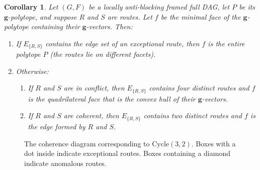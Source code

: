 \documentclass[10pt,a4paper]{amsart}
\newtheorem{corollary}{Corollary}
\newcommand\Cycle{\mathrm{Cycle}}
\newcommand\bg{\mathbf{g}}
\begin{document}
\begin{corollary}\label{cor:incoherence-square}
    Let $(G,F)$ be a locally anti-blocking framed full DAG, let $P$ be its $\bg$-polytope, and suppose $R$ and $S$ are routes.
    Let $f$ be the minimal face of the $\bg$-polytope containing their $\bg$-vectors. 
    Then:
    \begin{enumerate}
    [label=(\roman*)]
        \item If $E_{\{R,S\}}$ contains the edge set of an exceptional route, then $f$ is the entire polytope $P$ (the routes lie on different facets).
        \item Otherwise:
        \begin{enumerate}
        \item If $R$ and $S$ are in conflict, then $E_{\{R,S\}}$ contains four distinct routes and $f$ is the quadrilateral face that is the convex hull of their $\bg$-vectors.
        \item If $R$ and $S$ are coherent, then $E_{\{R,S\}}$ contains two distinct routes and $f$ is the edge formed by $R$ and $S$.
        \end{enumerate}
    \end{enumerate}
\end{corollary}

\begin{figure}
    \centering
    
    \caption{The coherence diagram corresponding to $\Cycle(3,2)$.
    Boxes with a dot inside indicate exceptional routes.
    Boxes containing a diamond indicate anomalous routes.
    }
    \label{fig:cycle32diagram}
\end{figure}
\end{document}
